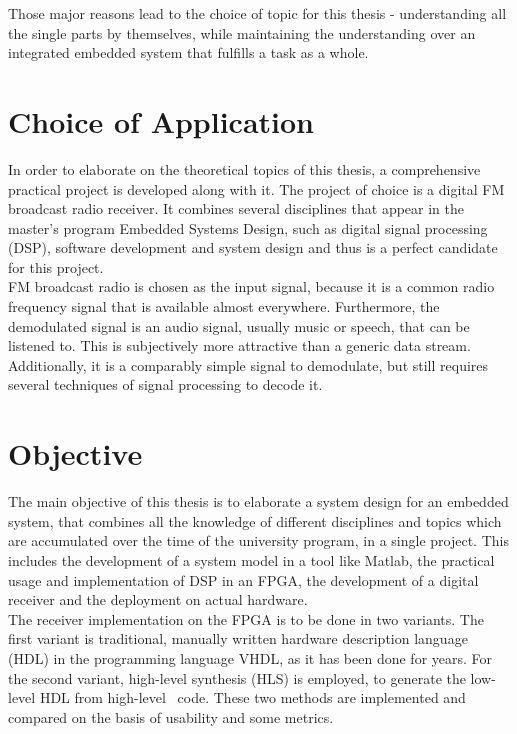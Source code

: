 Those major reasons lead to the choice of topic for this thesis - understanding all the single parts by themselves, while maintaining the understanding over an integrated embedded system that fulfills a task as a whole.

\section{Choice of Application}

In order to elaborate on the theoretical topics of this thesis, a comprehensive practical project is developed along with it.
The project of choice is a digital FM broadcast radio receiver.
It combines several disciplines that appear in the master's program Embedded Systems Design, such as digital signal processing (DSP), software development and system design and thus is a perfect candidate for this project.\\

FM broadcast radio is chosen as the input signal, because it is a common radio frequency signal that is available almost everywhere.
Furthermore, the demodulated signal is an audio signal, usually music or speech, that can be listened to.
This is subjectively more attractive than a generic data stream.
Additionally, it is a comparably simple signal to demodulate, but still requires several techniques of signal processing to decode it.

\section{Objective}

The main objective of this thesis is to elaborate a system design for an embedded system, that combines all the knowledge of different disciplines and topics which are accumulated over the time of the university program, in a single project.
This includes the development of a system model in a tool like Matlab, the practical usage and implementation of DSP in an FPGA, the development of a digital receiver and the deployment on actual hardware.\\

The receiver implementation on the FPGA is to be done in two variants.
The first variant is traditional, manually written hardware description language (HDL) in the programming language VHDL, as it has been done for years.
For the second variant, high-level synthesis (HLS) is employed, to generate the low-level HDL from high-level \cplusplus\ code.
These two methods are implemented and compared on the basis of usability and some metrics.\\

